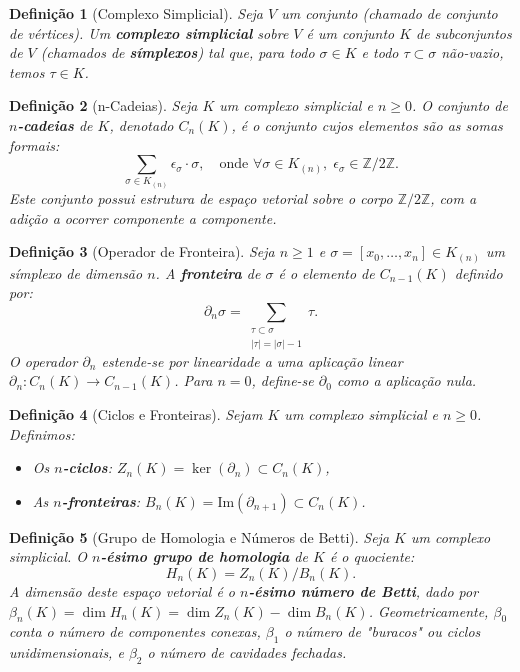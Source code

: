 \documentclass[12pt, a4paper]{article}
\newtheorem{definition}{Definição}
\begin{document}
\begin{definition}[Complexo Simplicial]
Seja $V$ um conjunto (chamado de conjunto de vértices). Um \textbf{complexo simplicial} sobre $V$ é um conjunto $K$ de subconjuntos de $V$ (chamados de \textbf{símplexos}) tal que, para todo $\sigma \in K$ e todo $\tau \subset \sigma$ não-vazio, temos $\tau \in K$.
\end{definition}

\begin{definition}[n-Cadeias]
Seja $K$ um complexo simplicial e $n \geq 0$. O conjunto de \textbf{$n$-cadeias} de $K$, denotado $C_n(K)$, é o conjunto cujos elementos são as somas formais:
\[
\sum_{\sigma \in K_{(n)}} \epsilon_\sigma \cdot \sigma, \quad \text{onde } \forall \sigma \in K_{(n)},\; \epsilon_\sigma \in \mathbb{Z}/2\mathbb{Z}.
\]
Este conjunto possui estrutura de espaço vetorial sobre o corpo $\mathbb{Z}/2\mathbb{Z}$, com a adição a ocorrer componente a componente.
\end{definition}

\begin{definition}[Operador de Fronteira]
Seja $n \geq 1$ e $\sigma = [x_0, \ldots, x_n] \in K_{(n)}$ um símplexo de dimensão $n$. A \textbf{fronteira} de $\sigma$ é o elemento de $C_{n-1}(K)$ definido por:
\[
\partial_n \sigma = \sum_{\substack{\tau \subset \sigma \\ |\tau| = |\sigma| - 1}} \tau.
\]
O operador $\partial_n$ estende-se por linearidade a uma aplicação linear $\partial_n: C_n(K) \to C_{n-1}(K)$. Para $n = 0$, define-se $\partial_0$ como a aplicação nula.
\end{definition}

\begin{definition}[Ciclos e Fronteiras]
Sejam $K$ um complexo simplicial e $n \geq 0$. Definimos:
\begin{itemize}
    \item Os \textbf{$n$-ciclos}: $Z_n(K) = \ker(\partial_n) \subset C_n(K)$,
    \item As \textbf{$n$-fronteiras}: $B_n(K) = \mathrm{Im}(\partial_{n+1}) \subset C_n(K)$.
\end{itemize}
\end{definition}

\begin{definition}[Grupo de Homologia e Números de Betti]
Seja $K$ um complexo simplicial. O \textbf{$n$-ésimo grupo de homologia} de $K$ é o quociente:
\[
H_n(K) = Z_n(K) / B_n(K).
\]
A dimensão deste espaço vetorial é o \textbf{$n$-ésimo número de Betti}, dado por $\beta_n(K) = \dim H_n(K) = \dim Z_n(K) - \dim B_n(K)$. Geometricamente, $\beta_0$ conta o número de componentes conexas, $\beta_1$ o número de "buracos" ou ciclos unidimensionais, e $\beta_2$ o número de cavidades fechadas.
\end{definition}
\end{document}
